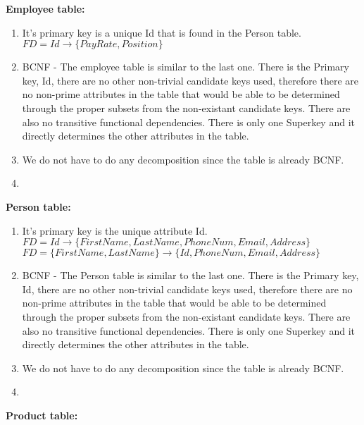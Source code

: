\documentclass{article}
\begin{document}
  \par\textbf{Employee table:}
  \begin{enumerate}[label=\roman*]
  	\item It's primary key is a unique Id that is found in the Person table. \newline
    $FD = Id \rightarrow \{PayRate, Position\}$
  	\item BCNF - The employee table is similar to the last one. There is the Primary key, Id, there are no other non-trivial candidate keys used, therefore there are no non-prime attributes in the table that would be able to be determined through the proper subsets from the non-existant candidate keys. There are also no transitive functional dependencies. There is only one Superkey and it directly determines the other attributes in the table.
  	\item We do not have to do any decomposition since the table is already BCNF.
  	\item
  \end{enumerate}
  \par\textbf{Person table:}
  \begin{enumerate}[label=\roman*]
  	\item It's primary key is the unique attribute Id. \newline
    $FD = Id \rightarrow \{FirstName, LastName, PhoneNum, Email, Address\}$\newline
    $FD = \{FirstName, LastName\} \rightarrow \{Id, PhoneNum, Email, Address\}$
  	\item BCNF - The Person table is similar to the last one. There is the Primary key, Id, there are no other non-trivial candidate keys used, therefore there are no non-prime attributes in the table that would be able to be determined through the proper subsets from the non-existant candidate keys. There are also no transitive functional dependencies. There is only one Superkey and it directly determines the other attributes in the table.
  	\item We do not have to do any decomposition since the table is already BCNF.
  	\item
  \end{enumerate}
  \par\textbf{Product table:}
\end{document}
